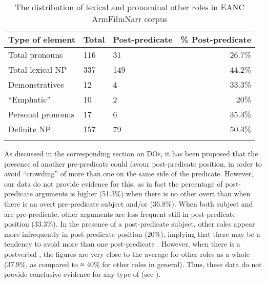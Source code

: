 \documentclass[output=paper,colorlinks,citecolor=brown,draftmode]{langscibook}
\begin{document}
\begin{table}
    \begin{tabularx}{\textwidth}{lYYr}
\lsptoprule
Type of element & Total & Post-predicate & \% Post-predicate \\
\midrule
Total pronouns & 116 & 31 & 26.7\% \\
Total lexical NP & 337 & 149 & 44.2\% \\
Demonstratives & 12 & 4 & 33.3\% \\
``Emphatic''  & 10 & 2 & 20\% \\
Personal pronouns & 17 & 6 & 35.3\% \\
Definite NP & 157 & 79 & 50.3\% \\
\lspbottomrule
    \end{tabularx}
    \caption{The distribution of lexical and pronominal other roles in EANC ArmFilmNarr corpus }
    \label{Armenian:tab:21}
\end{table}

 As discussed in the corresponding section on DOs, it has been proposed that the presence of another pre-predicate  could favour post-predicate position, in order to avoid ``crowding'' of more than one  on the same side of the predicate. However, our data do not provide evidence for this, as in fact the percentage of post-predicate arguments is higher (51.3\%) when there is no other overt  than when there is an overt pre-predicate subject and/or  (36.8\%). When both subject and  are pre-predicate, other arguments are less frequent still in post-predicate position (33.3\%). In the presence of a post-predicate subject, other roles appear more infrequently in post-predicate position (20\%), implying that there may be a tendency to avoid more than one post-predicate . However, when there is a postverbal , the figures are very close to the average for other roles as a whole (37.9\%, as compared to ≈ 40\% for other roles in general). Thus, these data do not provide conclusive evidence for any type of  (see ).
\end{document}
